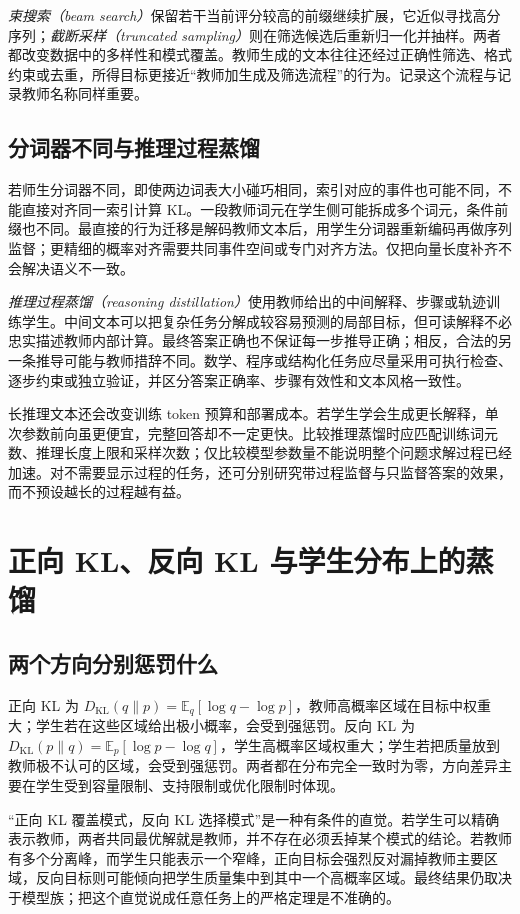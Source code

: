 \documentclass[UTF8,12pt,a4paper,fontset=fandol]{ctexart}
\begin{document}
\emph{束搜索（beam search）}保留若干当前评分较高的前缀继续扩展，它近似寻找高分序列；\emph{截断采样（truncated sampling）}则在筛选候选后重新归一化并抽样。两者都改变数据中的多样性和模式覆盖。教师生成的文本往往还经过正确性筛选、格式约束或去重，所得目标更接近“教师加生成及筛选流程”的行为。记录这个流程与记录教师名称同样重要。

\subsection{分词器不同与推理过程蒸馏}
若师生分词器不同，即使两边词表大小碰巧相同，索引对应的事件也可能不同，不能直接对齐同一索引计算 KL。一段教师词元在学生侧可能拆成多个词元，条件前缀也不同。最直接的行为迁移是解码教师文本后，用学生分词器重新编码再做序列监督；更精细的概率对齐需要共同事件空间或专门对齐方法。仅把向量长度补齐不会解决语义不一致。

\emph{推理过程蒸馏（reasoning distillation）}使用教师给出的中间解释、步骤或轨迹训练学生。中间文本可以把复杂任务分解成较容易预测的局部目标，但可读解释不必忠实描述教师内部计算。最终答案正确也不保证每一步推导正确；相反，合法的另一条推导可能与教师措辞不同。数学、程序或结构化任务应尽量采用可执行检查、逐步约束或独立验证，并区分答案正确率、步骤有效性和文本风格一致性。

长推理文本还会改变训练 token 预算和部署成本。若学生学会生成更长解释，单次参数前向虽更便宜，完整回答却不一定更快。比较推理蒸馏时应匹配训练词元数、推理长度上限和采样次数；仅比较模型参数量不能说明整个问题求解过程已经加速。对不需要显示过程的任务，还可分别研究带过程监督与只监督答案的效果，而不预设越长的过程越有益。

\section{正向 KL、反向 KL 与学生分布上的蒸馏}
\label{sec:kd-onpolicy}

\subsection{两个方向分别惩罚什么}
正向 KL 为 $D_{\mathrm{KL}}(q\|p)=\mathbb E_q[\log q-\log p]$，教师高概率区域在目标中权重大；学生若在这些区域给出极小概率，会受到强惩罚。反向 KL 为 $D_{\mathrm{KL}}(p\|q)=\mathbb E_p[\log p-\log q]$，学生高概率区域权重大；学生若把质量放到教师极不认可的区域，会受到强惩罚。两者都在分布完全一致时为零，方向差异主要在学生受到容量限制、支持限制或优化限制时体现。

“正向 KL 覆盖模式，反向 KL 选择模式”是一种有条件的直觉。若学生可以精确表示教师，两者共同最优解就是教师，并不存在必须丢掉某个模式的结论。若教师有多个分离峰，而学生只能表示一个窄峰，正向目标会强烈反对漏掉教师主要区域，反向目标则可能倾向把学生质量集中到其中一个高概率区域。最终结果仍取决于模型族；把这个直觉说成任意任务上的严格定理是不准确的。
\end{document}
